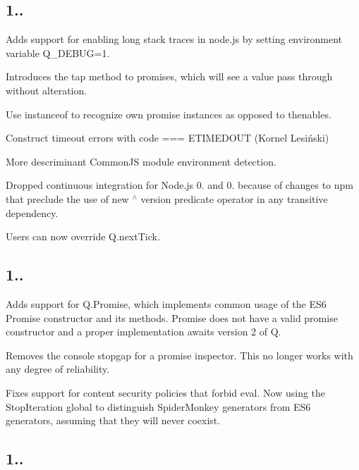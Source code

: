 \subsection*{1..}


\begin{DoxyItemize}
\item Adds support for enabling long stack traces in node.\+js by setting environment variable {\ttfamily Q\+\_\+\+D\+E\+B\+UG=1}.
\item Introduces the {\ttfamily tap} method to promises, which will see a value pass through without alteration.
\item Use instanceof to recognize own promise instances as opposed to thenables.
\item Construct timeout errors with {\ttfamily code === E\+T\+I\+M\+E\+D\+O\+UT} (Kornel Lesiński)
\item More descriminant Common\+JS module environment detection.
\item Dropped continuous integration for Node.\+js 0. and 0. because of changes to npm that preclude the use of new {\ttfamily $^\wedge$} version predicate operator in any transitive dependency.
\item Users can now override {\ttfamily Q.\+next\+Tick}.
\end{DoxyItemize}

\subsection*{1..}


\begin{DoxyItemize}
\item Adds support for {\ttfamily Q.\+Promise}, which implements common usage of the E\+S6 {\ttfamily Promise} constructor and its methods. {\ttfamily Promise} does not have a valid promise constructor and a proper implementation awaits version 2 of Q.
\item Removes the console stopgap for a promise inspector. This no longer works with any degree of reliability.
\item Fixes support for content security policies that forbid eval. Now using the {\ttfamily Stop\+Iteration} global to distinguish Spider\+Monkey generators from E\+S6 generators, assuming that they will never coexist.
\end{DoxyItemize}

\subsection*{1..}

